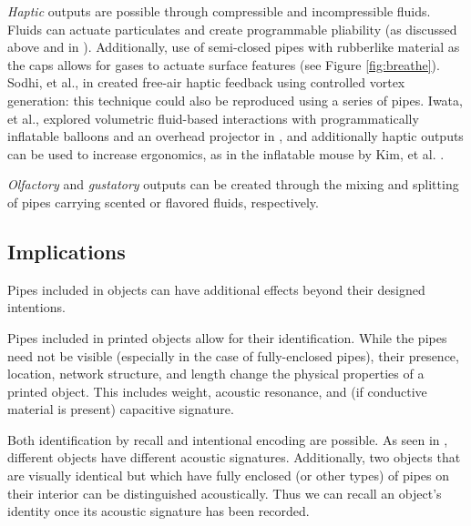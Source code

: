 \emph{Haptic} outputs are possible through compressible and incompressible fluids.  Fluids can actuate particulates and create programmable pliability (as discussed above and in \cite{Follmer-jamming}).  Additionally, use of semi-closed pipes with rubberlike material as the caps allows for gases to actuate surface features (see Figure \ref{fig:breathe}).  Sodhi, et al., in \cite{Sodhi-aireal} created free-air haptic feedback using controlled vortex generation: this technique could also be reproduced using a series of pipes.  Iwata, et al., explored volumetric fluid-based interactions with programmatically inflatable balloons and an overhead projector in \cite{Iwata-volflex}, and additionally haptic outputs can be used to increase ergonomics, as in the inflatable mouse by Kim, et al. \cite{Kim-inflatablemouse}.

\emph{Olfactory} and \emph{gustatory} outputs can be created through the mixing and splitting of pipes carrying scented or flavored fluids, respectively.

\subsection{Implications}



Pipes included in objects can have additional effects beyond their designed intentions.

Pipes included in printed objects allow for their identification.  While the pipes need not be visible (especially in the case of fully-enclosed pipes), their presence, location, network structure, and length change the physical properties of a printed object.  This includes weight, acoustic resonance, and (if conductive material is present) capacitive signature.


Both identification by recall and intentional encoding are possible.  As seen in \cite{Ono-touchandactivate}, different objects have different acoustic signatures.  Additionally, two objects that are visually identical but which have fully enclosed (or other types) of pipes on their interior can be distinguished acoustically.  Thus we can recall an object's identity once its acoustic signature has been recorded.

